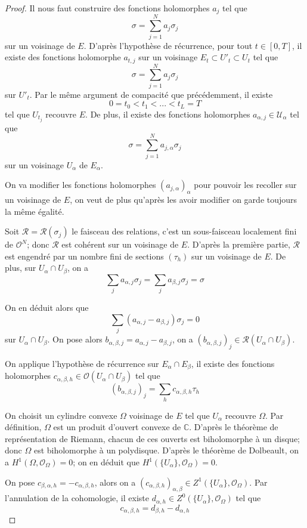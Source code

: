 \documentclass{article}
\theoremstyle{definition}
\theoremstyle{remarque}
\begin{document}
\begin{proof}
Il nous faut construire des fonctions holomorphes $a_j$ tel que 
$$\sigma = \sum_{j=1}^N a_j\sigma_j$$ sur un voisinage de $E$. D'après l'hypothèse de récurrence, pour tout $t \in [0, T]$, il existe des fonctions holomorphe $a_{t,j}$ sur un voisinage $E_t \subset U'_t \subset U_t$ tel que
$$\sigma = \sum_{j=1}^N a_j\sigma_j$$
sur $U'_t$. Par le même argument de compacité que précédemment, il existe $$0 = t_0 < t_1 < ... < t_L = T$$ tel que ${U_{t_j}}$ recouvre $E$. De plus, il existe des fonctions holomorphes $a_{\alpha,j} \in \mathcal{U_\alpha}$ tel que $$\sigma = \sum_{j=1}^N a_{j, \alpha}\sigma_j$$ sur un voisinage $U_\alpha$ de $E_\alpha$.

On va modifier les fonctions holomorphes $(a_{j, \alpha})_\alpha$ pour pouvoir les recoller sur un voisinage de $E$, on veut de plus qu'après les avoir modifier on garde toujours la même égalité.

Soit $\mathcal{R} = \mathcal{R}(\sigma_j)$ le faisceau des relations, c'est un sous-faisceau localement fini de $\mathcal{O}^N$; donc $\mathcal{R}$ est cohérent sur un voisinage de $E$. D'après la première partie, $\mathcal{R}$ est engendré par un nombre fini de sections $(\tau_h)$ sur un voisinage de $E$. De plus, sur $U_\alpha \cap U_\beta$, on a $$\sum_j a_{\alpha,j}\sigma_j =\sum_j a_{\beta,j}\sigma_j = \sigma$$

On en déduit alors que
$$\sum_j (a_{\alpha,j} - a_{\beta,j})\sigma_j = 0$$ sur $U_\alpha \cap U_\beta$. On pose alors $b_{\alpha, \beta, j} = a_{\alpha,j} - a_{\beta,j}$, on a $(b_{\alpha, \beta, j})_j \in \mathcal{R}(U_\alpha \cap U_\beta)$.

On applique l'hypothèse de récurrence sur $E_\alpha \cap E_\beta$, il existe des fonctions holomorphes $c_{\alpha,\beta,h} \in \mathcal{O}(U_\alpha \cap U_\beta)$ tel que
$$(b_{\alpha,\beta,j})_j = \sum_h c_{\alpha,\beta,h}\tau_h$$

On choisit un cylindre convexe $\Omega$ voisinage de $E$ tel que ${U_\alpha}$ recouvre $\Omega$. Par définition, $\Omega$ est un produit d'ouvert convexe de $\mathbb{C}$. D'après le théorème de représentation de Riemann, chacun de ces ouverts est biholomorphe à un disque; donc $\Omega$ est biholomorphe à un polydisque. D'après le théorème de Dolbeault, on a $H^1(\Omega, \mathcal{O}_\Omega)=0$; on en déduit que $H^1(\{U_\alpha\}, \mathcal{O}_\Omega)=0$.

On pose $c_{\beta, \alpha, h} = - c_{\alpha, \beta, h}$, alors on a $(c_{\alpha,\beta,h})_{\alpha,\beta} \in Z^1(\{U_\alpha\}, \mathcal{O}_\Omega)$. Par l'annulation de la cohomologie, il existe $d_{\alpha, h} \in Z^0(\{U_\alpha\}, \mathcal{O}_\Omega)$ tel que $$c_{\alpha, \beta, h} = d_{\beta, h} - d_{\alpha, h}$$


\end{proof}
\end{document}
